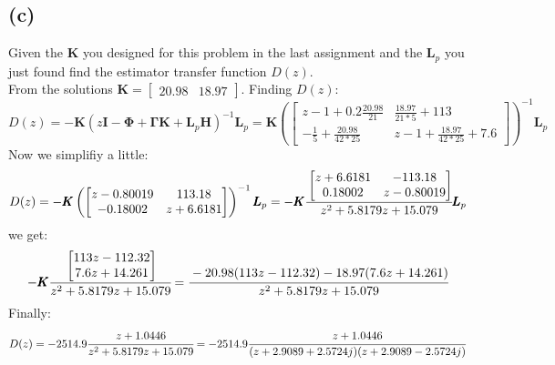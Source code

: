 \documentclass{article}
\begin{document}
\subsection*{(c)}
Given the $\pmb{K}$ you designed for this problem in the last assignment and the $\pmb{L}_p$ you just found find the estimator transfer function $D(z)$.\\
From the solutions $\pmb{K}=\begin{bmatrix}20.98&18.97\end{bmatrix}$. Finding $D(z)$:
\[D(z)=-\pmb{K}(z\pmb{I}-\pmb{\Phi}+\pmb{\Gamma}\pmb{K}+\pmb{L}_p\pmb{H})^{-1}\pmb{L}_p=\pmb{K}\left
    (\begin{bmatrix}z-1+0.2\frac{20.98}{21}&\frac{18.97}{21*5}+113\\[0.5em]-\frac{1}{5}+\frac{20.98}{42*25}&z-1+\frac{18.97}{42*25}+7.6\end{bmatrix}\right )^{-1}\pmb{L}_p\]
Now we simplifiy a little:
\[D(z)=-\pmb{K}\left (\begin{bmatrix}z-0.80019&113.18\\-0.18002&z+6.6181\end{bmatrix}\right )^{-1}\pmb{L}_p=-\pmb{K}\cfrac{\begin{bmatrix}z+6.6181&-113.18\\0.18002&z-0.80019\end{bmatrix}}{z^2+5.8179z+15.079}\pmb{L}_p\]
we get:
\[-\pmb{K}\cfrac{\begin{bmatrix}113z-112.32\\7.6z+14.261\end{bmatrix}}{z^2+5.8179z+15.079}=\cfrac{-20.98(113z-112.32)-18.97(7.6z+14.261)}{z^2+5.8179z+15.079}\]
Finally:
\[D(z)=-2514.9\cfrac{z+1.0446}{z^2+5.8179z+15.079}=-2514.9\cfrac{z+1.0446}{(z+2.9089+2.5724j)(z+2.9089-2.5724j)}\]
\end{document}
